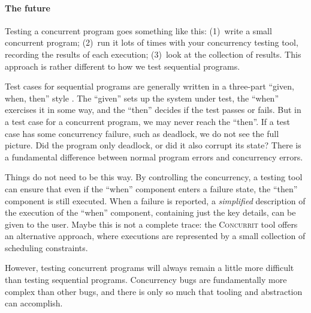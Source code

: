 \paragraph{The future}
Testing a concurrent program goes something like this: (1)~write a
small concurrent program; (2)~run it lots of times with your
concurrency testing tool, recording the results of each execution;
(3)~look at the collection of results.  This approach is rather
different to how we test sequential programs.

Test cases for sequential programs are generally written in a
three-part ``given, when, then'' style \parencite{fowler2013}.  The
``given'' sets up the system under test, the ``when'' exercises it in
some way, and the ``then'' decides if the test passes or fails.  But
in a test case for a concurrent program, we may never reach the
``then''.  If a test case has some concurrency failure, such as
deadlock, we do not see the full picture.  Did the program only
deadlock, or did it also corrupt its state?  There is a fundamental
difference between normal program errors and concurrency errors.

Things do not need to be this way.  By controlling the concurrency, a
testing tool can ensure that even if the ``when'' component enters a
failure state, the ``then'' component is still executed.  When a
failure is reported, a \emph{simplified} description of the execution
of the ``when'' component, containing just the key details, can be
given to the user.  Maybe this is not a complete trace: the
\textsc{Concurrit} \parencite{elmas2013} tool offers an alternative
approach, where executions are represented by a small collection of
scheduling constraints.

However, testing concurrent programs will always remain a little more
difficult than testing sequential programs.  Concurrency bugs are
fundamentally more complex than other bugs, and there is only so much
that tooling and abstraction can accomplish.
